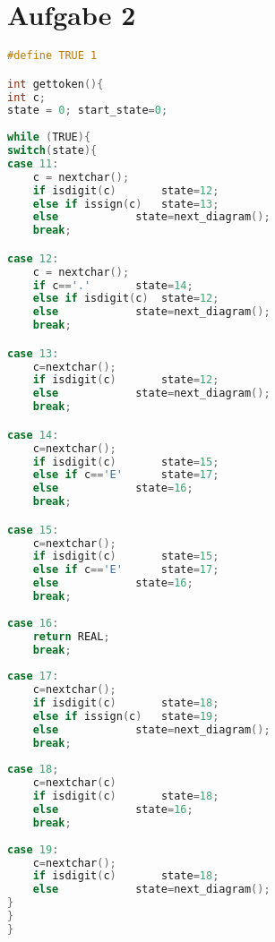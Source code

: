 \documentclass[11pt]{scrartcl}
\begin{document}
	\section*{Aufgabe 2}	\begin{lstlisting}[label=some-code,caption=Lexer Code f\"{u}r das REAL token,language=C]
#define TRUE 1

int gettoken(){
int c;
state = 0; start_state=0;
	
while (TRUE){
switch(state){
case 11:
	c = nextchar();
	if isdigit(c)		state=12;
	else if issign(c)	state=13;
	else			state=next_diagram();
	break;

case 12:
	c = nextchar();
	if c=='.'		state=14;
	else if isdigit(c)	state=12;
	else			state=next_diagram();
	break;

case 13:
	c=nextchar();
	if isdigit(c)		state=12;
	else			state=next_diagram();
	break;

case 14:
	c=nextchar();
	if isdigit(c)		state=15;
	else if c=='E'		state=17;
	else			state=16;
	break;

case 15:
	c=nextchar();
	if isdigit(c)		state=15;
	else if c=='E'		state=17;
	else			state=16;
	break;
	
case 16:
	return REAL;
	break;
	
case 17:
	c=nextchar();
	if isdigit(c)		state=18;
	else if issign(c)	state=19;
	else			state=next_diagram();
	break;
	
case 18;
	c=nextchar(c)
	if isdigit(c)		state=18;
	else			state=16;
	break;
	
case 19:
	c=nextchar();
	if isdigit(c)		state=18;
	else			state=next_diagram();
}
}
}
	\end{lstlisting}
\end{document}
